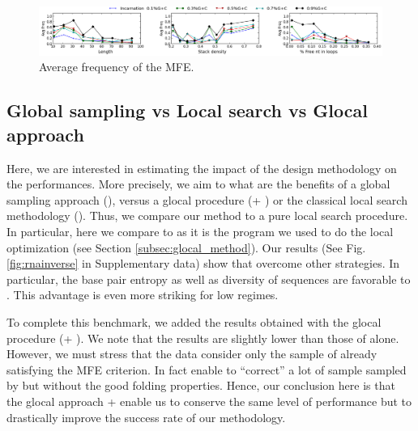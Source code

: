 \begin{figure}[ht!]
	\centering
	\includegraphics[width=\textwidth]{Figures/freq.png}
	\caption{Average frequency of the MFE.}
	\label{fig:freq}
\end{figure}

\subsection{Global sampling vs Local search vs Glocal approach}
Here, we are interested in estimating the impact of the design methodology on the performances. More precisely, we aim to what are the benefits of a global sampling approach (\ourprog), versus a glocal procedure (\ourprog + \RNAinverse) or the classical local search methodology (\RNAinverse). Thus, we compare our method to a pure local search procedure. In particular, here we compare to \RNAinverse as it is the program we used to do the local optimization (see Section \ref{subsec:glocal_method}). Our results (See Fig. \ref{fig:rnainverse} in Supplementary data) show that \ourprog overcome other strategies. In particular, the base pair entropy as well as diversity of sequences are favorable to \ourprog. This advantage is even more striking for low \GCContent regimes.

To complete this benchmark, we added the results obtained with the glocal procedure (\ourprog + \RNAinverse). We note that the results are slightly lower than those of \ourprog alone. However, we must stress that the \ourprog data consider only the sample of \ourprog already satisfying the MFE criterion. In fact \RNAinverse enable to ``correct'' a lot of sample sampled by \ourprog but without the good folding properties. Hence, our conclusion here is that the glocal approach \ourprog + \RNAinverse enable us to conserve the same level of performance but to drastically improve the success rate of our methodology. 






\label{fig:rnainverse}


